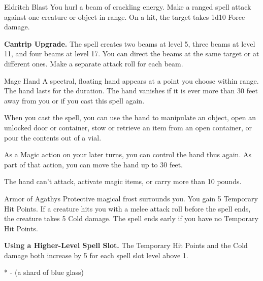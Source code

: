 


\pagestyle{empty}

\begin{Spell}[
  level=Cantrip,
  time=1 Action,
  range=120 ft.,
  components={V, S},
  duration=Instantaneous,
  school=Evocation,
  attack=Ranged,
  effect=Force
]{Eldritch Blast}
You hurl a beam of crackling energy. Make a ranged spell attack against one creature or object in range. On a hit, the target takes 1d10 Force damage.

\textbf{Cantrip Upgrade.} The spell creates two beams at level 5, three beams at level 11, and four beams at level 17. You can direct the beams at the same target or at different ones. Make a separate attack roll for each beam.
\end{Spell}


\begin{Spell}[
  level=Cantrip,
  time=1 Action,
  range=30 ft.,
  components={V, S},
  duration=1 Minute,
  school=Conjuration,
  attack=None,
  effect=Utility
]{Mage Hand}
A spectral, floating hand appears at a point you choose within range. The hand lasts for the duration. The hand vanishes if it is ever more than 30 feet away from you or if you cast this spell again.

When you cast the spell, you can use the hand to manipulate an object, open an unlocked door or container, stow or retrieve an item from an open container, or pour the contents out of a vial.

As a Magic action on your later turns, you can control the hand thus again. As part of that action, you can move the hand up to 30 feet.

The hand can't attack, activate magic items, or carry more than 10 pounds.
\end{Spell}

\begin{Spell}[
  level=1st,
  time=1 Bonus Action,
  range=Self,
  components={V, S, M*},
  duration=1 Hour,
  school=Abjuration,
  attack=None,
  effect=Cold
]{Armor of Agathys}
Protective magical frost surrounds you. You gain 5 Temporary Hit Points. If a creature hits you with a melee attack roll before the spell ends, the creature takes 5 Cold damage. The spell ends early if you have no Temporary Hit Points.

\textbf{Using a Higher-Level Spell Slot.} The Temporary Hit Points and the Cold damage both increase by 5 for each spell slot level above 1.

* - (a shard of blue glass)

\end{Spell}

